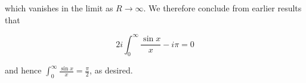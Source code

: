 \begin{solution}
    which vanishes in the limit as $R \to \infty$. We therefore conclude from earlier results that

    $$
    2i \int_{0}^{\infty} {\frac{\sin{x}}{x}} - i \pi = 0
    $$

    and hence $\int_{0}^{\infty} {\frac{\sin{x}}{x}} = \frac{\pi}{2}$, as desired.

    \ \\
\end{solution}